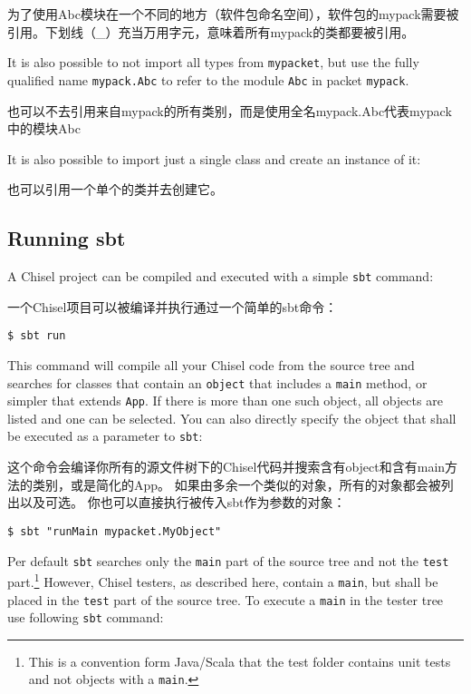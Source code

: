 \documentclass[%
    10pt,
    headinclude, footexclude,
    openright, %
    notitlepage,
    cleardoubleempty,
    headsepline,
    pointlessnumbers,
    bibtotoc, idxtotoc,
    ]{scrbook}
\newcommand{\code}[1]{{\small{\texttt{#1}}}}
\newcommand{\codefoot}[1]{{\footnotesize{\texttt{#1}}}}
\begin{document}
为了使用Abc模块在一个不同的地方（软件包命名空间），软件包的mypack需要被引用。下划线（_）充当万用字元，意味着所有mypack的类都要被引用。



\noindent It is also possible to not import all types from \code{mypacket},
but use the fully qualified name \code{mypack.Abc} to refer to the module
\code{Abc} in packet \code{mypack}.

也可以不去引用来自mypack的所有类别，而是使用全名mypack.Abc代表mypack中的模块Abc


\noindent It is also possible to import just a single class and create an instance of it:

也可以引用一个单个的类并去创建它。



\subsection{Running sbt}

A Chisel project can be compiled and executed with a simple \code{sbt} command:

一个Chisel项目可以被编译并执行通过一个简单的sbt命令：

\begin{verbatim}
$ sbt run
\end{verbatim}

This command will compile all your Chisel code from the source tree and searches
for classes that contain an \code{object} that includes a \code{main} method, or simpler
that extends \code{App}. If there is more than one such object, all objects are listed and
one can be selected.
You can also directly specify the object that shall be executed as a parameter to \code{sbt}:

这个命令会编译你所有的源文件树下的Chisel代码并搜索含有object和含有main方法的类别，或是简化的App。
如果由多余一个类似的对象，所有的对象都会被列出以及可选。
你也可以直接执行被传入sbt作为参数的对象：


\begin{verbatim}
$ sbt "runMain mypacket.MyObject"
\end{verbatim}

Per default \code{sbt} searches only the \code{main} part of the source tree and not
the \code{test} part.\footnote{This is a convention form Java/Scala that the test folder contains
unit tests and not objects with a \codefoot{main}.} However, Chisel testers, as described here,
contain a \code{main}, but shall be placed in the \code{test} part of the source tree.
To execute a \code{main} in the tester tree use following \code{sbt} command:
\end{document}
